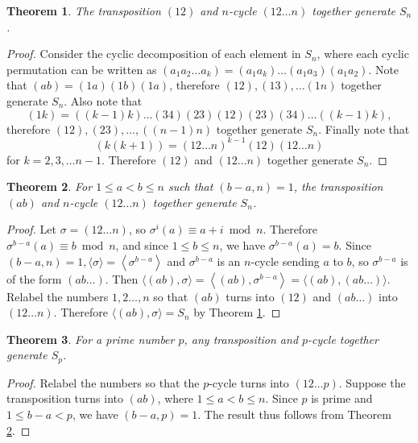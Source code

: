 \documentclass[12pt]{article}
\newtheorem{theorem}{Theorem}
\begin{document}
\begin{theorem} \label{thm:symmetric-12-12n}
    The transposition $(12)$ and $n$-cycle $(12 \dots n)$ together generate $S_n$. 
\end{theorem}
\begin{proof}
    Consider the cyclic decomposition of each element in $S_n$, where each cyclic permutation can be written as 
    $
    (a_1a_2\dots a_k) = (a_1 a_k) \dots (a_1 a_3) (a_1 a_2). 
    $
    Note that $(ab) = (1a)(1b)(1a)$, therefore $(12), (13), \ldots (1n)$ together generate $S_n$. Also note that  
    $$(1k)=((k-1)k)\dots(34)(23)(12)(23)(34)\dots((k-1)k),$$
    therefore $(12), (23), \dots, ((n-1)n)$ together generate $S_n$. Finally note that 
    $$
    (k(k+1)) = (12\dots n)^{k-1} (12) (12\dots n)
    $$
    for $k = 2, 3, \dots n - 1$. Therefore $(12)$ and $(12 \dots n)$ together generate $S_n$. 
\end{proof}

\begin{theorem} \label{thm:symmetric-ab-12n}
    For $1 \le a < b \le n$ such that $(b - a, n) = 1$, the transposition $(ab)$ and $n$-cycle $(12 \dots n)$ together generate $S_n$.
\end{theorem}
\begin{proof}
   Let $\sigma=(12 \ldots n)$, so $\sigma^i(a) \equiv a+i \bmod n$. Therefore $\sigma^{b-a}(a) \equiv b \bmod n$, and since $1 \le b \le n$, we have $\sigma^{b-a}(a)=b$. Since $(b-a, n)=1,\langle\sigma\rangle=\left\langle\sigma^{b-a}\right\rangle$ and $\sigma^{b-a}$ is an $n$-cycle sending $a$ to $b$, so $\sigma^{b-a}$ is of the form $(a b \ldots)$. Then
$
\langle(a b), \sigma\rangle=\left\langle(a b), \sigma^{b-a}\right\rangle=\langle(a b),(a b \ldots)\rangle .
$
Relabel the numbers $1,2 \ldots, n$ so that $(a b)$ turns into $(12)$ and $(a b \ldots)$ into $(12 \ldots n)$. Therefore $\langle(a b), \sigma\rangle=S_n$ by Theorem \ref{thm:symmetric-12-12n}.
\end{proof}

\begin{theorem} \label{thm:symmetric-prime}
    For a prime number $p$, any transposition and $p$-cycle together generate $S_p$.
\end{theorem}
\begin{proof}
    Relabel the numbers so that the $p$-cycle turns into $(12 \dots p)$. Suppose the transposition turns into $(ab)$, where $1 \le a < b \le n$. Since $p$ is prime and $1 \le b - a < p$, we have $(b - a, p) = 1$. The result thus follows from Theorem \ref{thm:symmetric-ab-12n}.
\end{proof}
\end{document}
